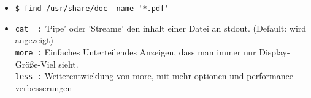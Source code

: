 \documentclass{scrartcl}
\begin{document}
\begin{itemize}
\item \verb!$ find /usr/share/doc -name '*.pdf'!

\item\verb!cat  :! 'Pipe' oder 'Streame' den inhalt einer Datei an stdout. (Default: wird angezeigt) \\
\verb!more :! Einfaches Unterteilendes Anzeigen, dass man immer nur Display-Größe-Viel sieht. \\
\verb!less :! Weiterentwicklung von more, mit mehr optionen und performance-verbesserungen

\end{itemize}
\end{document}
